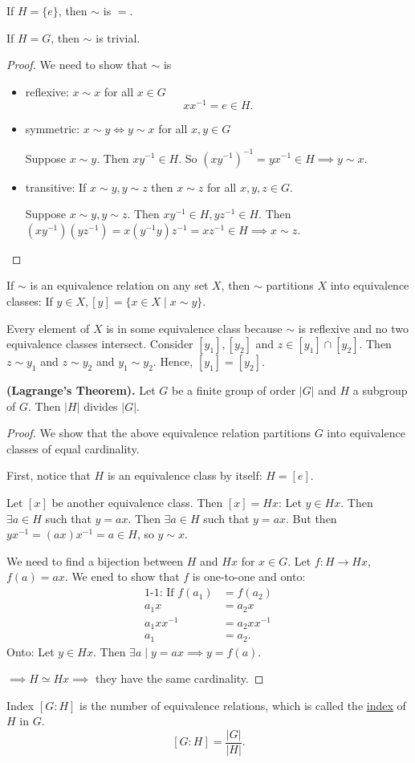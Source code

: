 If $H = \{e\}$, then $\sim$ is $=$. 

If $H = G$, then $\sim$ is trivial. 

\begin{proof}
We need to show that $\sim$ is
\begin{itemize}	
\item reflexive: $x\sim x$ for all $x\in G$
\[xx^{-1}=e\in H.\]
\item symmetric: $x\sim y \iff y\sim x$ for all $x, y\in G$

Suppose $x\sim y$. Then $xy^{-1}\in H$. So $(xy^{-1})^{-1}=yx^{-1}\in H\implies y\sim x$. 
\item transitive: If $x\sim y, y\sim z$ then $x\sim z$ for all $x, y, z \in G$. 

Suppose $x\sim y, y\sim z$. Then $xy^{-1}\in H, yz^{-1}\in H$. Then $(xy^{-1})(yz^{-1})=x(y^{-1}y)z^{-1}=xz^{-1}\in H\implies x\sim z$. 
\end{itemize}
\end{proof}

If $\sim$ is an equivalence relation on any set $X$, then $\sim$ partitions $X$ into equivalence classes: 
If $y\in X, [y]=\{x\in X\mid x\sim y\}$. 

Every element of $X$ is in some equivalence class because $\sim$ is reflexive and no two equivalence classes intersect. Consider $[y_1], [y_2]$ and $z\in [y_1]\cap [y_2]$. Then $z\sim y_1$ and $z\sim y_2$ and $y_1\sim y_2$. Hence, $[y_1] = [y_2]$. 

\begin{theorem}
\textbf{(Lagrange's Theorem).} Let $G$ be a finite group of order $|G|$ and $H$ a subgroup of $G$. Then $|H|$ divides $|G|$. 	
\end{theorem}
\begin{proof}
We show that the above equivalence relation partitions $G$ into equivalence classes of equal cardinality. 

First, notice that $H$ is an equivalence class by itself: $H = [e]$. 

Let $[x]$ be another equivalence class. Then $[x]=Hx$: 
Let $y\in Hx$. Then $\exists a\in H$ such that $y=ax$. Then $\exists a\in H$ such that $y=ax$. But then $yx^{-1} = (ax)x^{-1}=a\in H$, so $y\sim x$. 

We need to find a bijection between $H$ and $Hx$ for $x\in G$. Let $f: H\to Hx$, $f(a)=ax$. We ened to show that $f$ is one-to-one and onto: 
\begin{align*}
\text{1-1: If } f(a_1) &= f(a_2) \\
	a_1x &= a_2x \\
	a_1xx^{-1} &= a_2xx^{-1} \\
	a_1 &= a_2. 
\end{align*}
Onto: Let $y \in Hx$. Then $\exists a\mid y = ax\implies y = f(a)$. 

$\implies H\simeq Hx\implies$ they have the same cardinality. 

\end{proof}

\begin{defn}{Index}
$[G:H]$ is the number of equivalence relations, which is called the \ul{index} of $H$ in $G$. 
\[[G:H] = \frac{|G|}{|H|}.\]
\end{defn}
